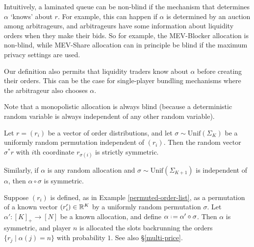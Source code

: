 \begin{remark}

  Intuitively, a laminated queue can be non-blind if the mechanism that determines $\alpha$ `knows' about $r$.
  For example, this can happen if $\alpha$ is determined by an auction among arbitrageurs, and arbitrageurs have some information about liquidity orders when they make their bids.
  So for example, the MEV-Blocker allocation is non-blind, while MEV-Share allocation can in principle be blind if the maximum privacy settings are used.

  Our definition also permits that liquidity traders know about $\alpha$ before creating their orders.
  This can be the case for single-player bundling mechanisms where the arbitrageur also chooses $\alpha$.

  Note that a monopolistic allocation is always blind (because a deterministic random variable is always independent of any other random variable).

\end{remark}


\begin{example} \label{permuted-order-list}

  Let $r=(r_i)$ be a vector of order distributions, and let $\sigma\sim\mathrm{Unif}(\Sigma_K)$ be a uniformly random permutation independent of $(r_i)$.
  Then the random vector $\sigma^*r$ with $i$th coordinate $r_{\sigma (i)}$ is strictly symmetric.

\end{example}

\begin{example} \label{permuted-allocation}

  Similarly, if \(\alpha\) is any random allocation and \(\sigma\sim\mathrm{Unif}(\Sigma_{K+1})\) is independent of \(\alpha\), then \(\alpha\circ\sigma\) is symmetric.

\end{example}

\begin{example} \label{known-matching-unknown-ordering}

  Suppose $(r_i)$ is defined, as in Example \ref{permuted-order-list}, as a permutation of a known vector $(r'_i)\in\mathbb R^K$ by a uniformly random permutation $\sigma$.
  Let $\alpha':[K]_+\rightarrow [N]$ be a known allocation, and define $\alpha\defeq\alpha'\circ\sigma$.
  Then $\alpha$ is symmetric, and player $n$ is allocated the slots backrunning the orders $\{r_j\mid \alpha(j)=n\}$ with probability $1$.
  See also \S\ref{multi-price}.

\end{example}

